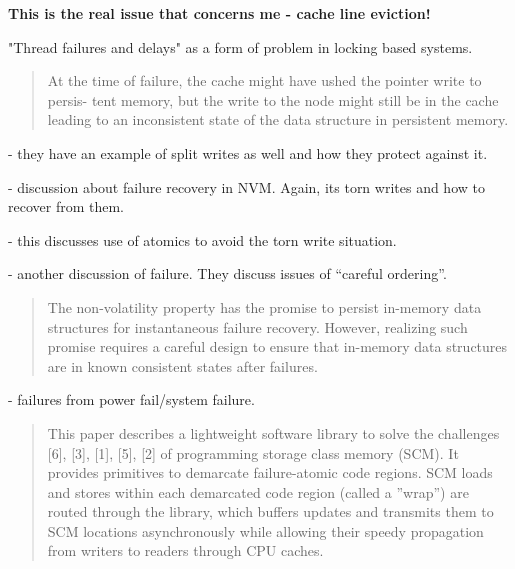 \textbf{\Large{This is the real issue that concerns me - cache line eviction!}}

"Thread failures and delays" as a form of problem in locking based systems. \cite{herlihy2014future}

\cite{joshi2015efficient}

\begin{quotation}
    At the time of failure, the
cache might have 
ushed the pointer write to persis-
tent memory, but the write to the node might still be
in the cache leading to an inconsistent state of the data
structure in persistent memory.
\end{quotation}

\cite{Oukid:2014:SHS:2619228.2619236} - they have an example of split writes as well and how they protect against it.

\cite{arulraj2015let} - discussion about failure recovery in NVM.  Again, its torn writes and how to recover from them.

\cite{dulloor2015systems} - this discusses use of atomics to avoid the torn write situation.

\cite{chatzistergiou2015rewind} - another discussion of failure.  They discuss issues of ``careful ordering''.

\begin{quotation}

    The non-volatility
property has the promise to persist in-memory data structures for
instantaneous failure recovery. However, realizing such promise
requires a careful design to ensure that in-memory data structures
are in known consistent states after failures.
\cite{chen2015persistent}
\end{quotation}


\cite{liang2016case} - failures from power fail/system failure.

\begin{quotation}

    This paper describes a lightweight software library to solve
    the challenges [6], [3], [1], [5], [2] of programming storage
    class memory (SCM). It provides primitives to demarcate
    failure-atomic code regions. SCM loads and stores within
    each demarcated code region (called a ”wrap”) are routed
    through the library, which buffers updates and transmits them
    to SCM locations asynchronously while allowing their speedy
    propagation from writers to readers through CPU caches.
        \cite{giles2015transaction}
\end{quotation}

